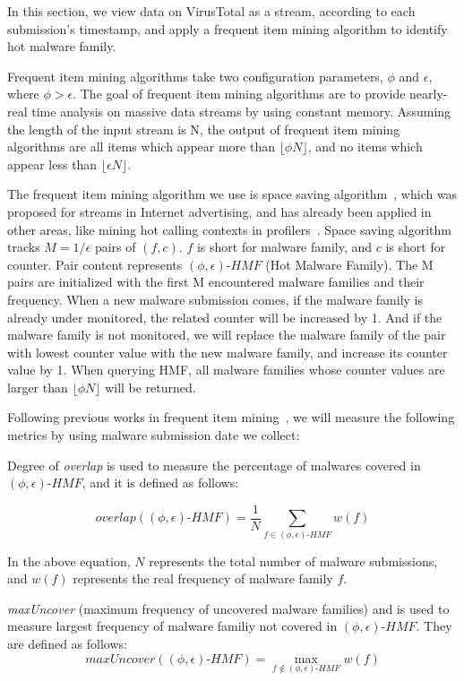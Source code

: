 In this section, we view data on VirusTotal as a stream, according to each submission's timestamp, 
and apply a frequent item mining algorithm to identify hot malware family. 

Frequent item mining algorithms take two configuration parameters, $\phi$ and $\epsilon$, where $\phi > \epsilon$. 
The goal of frequent item mining algorithms are to provide nearly-real time analysis on massive data streams by using constant memory. 
Assuming the length of the input stream is N, the output of frequent item mining algorithms 
are all items which appear more than $\lfloor \phi N \rfloor$, 
and no items which appear less than  $\lfloor \epsilon N \rfloor$. 

The frequent item mining algorithm we use is space saving algorithm~\cite{space-saving}, 
which was proposed for streams in Internet advertising, and has already been applied in other areas, 
like mining hot calling contexts in profilers~\cite{hot-calling-context}.
Space saving algorithm tracks $M=1/\epsilon$ pairs of $(f, c)$. 
$f$ is short for malware family, and $c$ is short for counter.  
Pair content represents $(\phi, \epsilon)\mbox{-}HMF$ (Hot Malware Family). 
The M pairs are initialized with the first M encountered malware families and their frequency. 
When a new malware submission comes, 
if the malware family is already under monitored, 
the related counter will be increased by 1. 
And if the malware family is not monitored, 
we will replace the malware family of the pair with lowest counter value with the new malware family, 
and increase its counter value by 1. 
When querying HMF, 
all malware families whose counter values are larger than $\lfloor \phi N \rfloor$ will be returned. 


Following previous works in frequent item mining~\cite{hot-calling-context}, 
we will measure the following metrics by using malware submission date we collect:

Degree of \textit{overlap} is used to measure the percentage of malwares covered in $(\phi, \epsilon)\mbox{-}HMF$,
and it is defined as follows:

$$overlap((\phi, \epsilon)\mbox{-}HMF) = \dfrac{1}{N}\sum_{f \in (\phi, \epsilon)\mbox{-}HMF}w(f)$$

In the above equation, $N$ represents the total number of malware submissions, and 
$w(f)$ represents the real frequency of malware family $f$.  

\textit{maxUncover} (maximum frequency of uncovered malware families) and 
is used 
to measure largest frequency of malware familiy not covered in $(\phi, \epsilon)\mbox{-}HMF$. 
They are defined as follows:
$$maxUncover((\phi, \epsilon)\mbox{-}HMF) = \max_{f \notin (\phi, \epsilon)\mbox{-}HMF}w(f)$$

